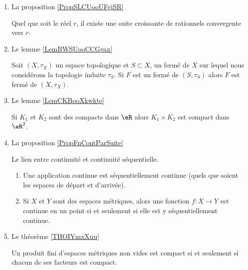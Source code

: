 \begin{enumerate}
\item  La proposition \ref{PropSLCUooUFgiSR}
\begin{proposition} 
    Quel que soit le réel \( r\), il existe une suite croissante de rationnels convergente vers \( r\).
\end{proposition}

\item Le lemme \ref{LemBWSUooCCGvax}

\begin{lemma}
    Soit \( (X,\tau_X)\) un espace topologique et \( S\subset X\), un fermé de \( X\) sur lequel nous considérons la topologie induite \( \tau_S\). Si \( F\) est un fermé de \( (S,\tau_S)\) alors \( F\) est fermé de \( (X,\tau_X)\).
\end{lemma}
            
\item Le lemme \ref{LemCKBooXkwkte}
    \begin{lemma}
    Si \( K_1\) et \( K_2\) sont des compacts dans \( \eR\) alors \( K_1\times K_2\) est compact dans \( \eR^2\).
\end{lemma}

\item La proposition \ref{PropFnContParSuite}

    \begin{proposition}
    Le lien entre continuité et continuité séquentielle.

    \begin{enumerate}
        \item
    Une application continue est séquentiellement continue (quels que soient les espaces de départ et d'arrivée).

\item
    
    Si \( X\) et \( Y\) sont des espaces métriques, alors une fonction \( f\colon X\to Y\) est continue en un point si et seulement si elle est y séquentiellement continue.
    \end{enumerate}
\end{proposition}

\item Le théorème \ref{THOIYmxXuu}

\begin{theorem}
    Un produit fini d'espaces métriques non vides est compact si et seulement si chacun de ses facteurs est compact.
\end{theorem}


\end{enumerate}

